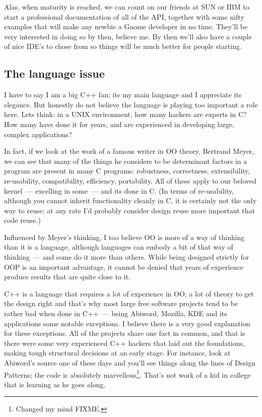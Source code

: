 \documentclass{memoir}
\begin{document}
Alas, when maturity is reached, we can count on our friends at SUN or
IBM to start a professional documentation of all of the API, together
with some nifty examples that will make any newbie a Gnome developer
in no time. They'll be very interested in doing so by then, believe
me. By then we'll also have a couple of nice IDE's to chose from so
things will be much better for people starting.

\subsection{The language issue}

I have to say I am a big C++ fan; its my main language and I
appreciate its elegance. But honestly do not believe the language is
playing too important a role here. Lets think: in a UNIX environment,
how many hackers are experts in C? How many have done it for years,
and are experienced in developing large, complex applications?

In fact, if we look at the work of a famous writer in OO theory,
Bertrand Meyer, we can see that many of the things he considers to be
determinant factors in a program are present in many C programs:
robustness, correctness, extensibility, re-usability, compatibility,
efficiency, portability. All of these apply to our beloved kernel~---
excelling in some~--- and its done in C. (In terms of re-usability,
although you cannot inherit functionality cleanly in C, it is
certainly not the only way to reuse; at any rate I'd probably consider
design reuse more important that code reuse.)

Influenced by Meyer's thinking, I too believe OO is more of a way of
thinking than it is a language, although languages can embody a bit of
that way of thinking~--- and some do it more than others. While being
designed strictly for OOP is an important advantage, it cannot be
denied that years of experience produce results that are quite close
to it.

C++ is a language that requires a lot of experience in OO, a lot of
theory to get the design right and that's why most large free software
projects tend to be rather bad when done in C++~--- being Abiword,
Mozilla, KDE and its applications some notable exceptions. I believe
there is a very good explanation for these exceptions. All of the
projects share one fact in common, and that is there were some very
experienced C++ hackers that laid out the foundations, making tough
structural decisions at an early stage. For instance, look at
Abiword's source one of these days and you'll see things along the
lines of Design Patterns; the code is absolutely
marvellous\footnote{Changed my mind FIXME.}. That's not work of a kid in
college that is learning as he goes along.
\end{document}
